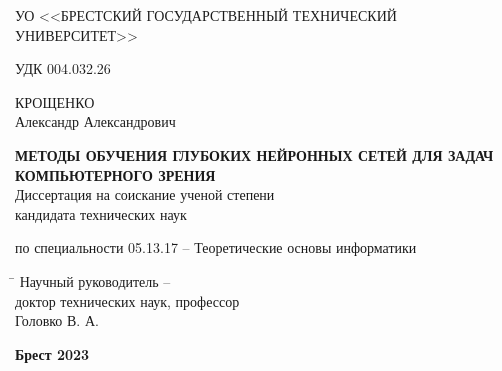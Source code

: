 \begin{titlepage}

\begin{center} \bfseries
\bigskip
\medskip

{УО <<БРЕСТСКИЙ ГОСУДАРСТВЕННЫЙ ТЕХНИЧЕСКИЙ УНИВЕРСИТЕТ>>}
\end{center}
\vspace{1cm}

\noindent УДК 004.032.26 \\
\vspace{1cm}

\begin{center}
{КРОЩЕНКО \\ Александр Александрович}\\ \vspace{1cm}

{\bfseries МЕТОДЫ ОБУЧЕНИЯ ГЛУБОКИХ НЕЙРОННЫХ СЕТЕЙ 
ДЛЯ ЗАДАЧ КОМПЬЮТЕРНОГО ЗРЕНИЯ}\\
\vspace{2cm}
Диссертация на соискание ученой степени\\
кандидата технических наук\\
\bigskip

по специальности 05.13.17 -- Теоретические основы информатики
\end{center}
\vspace{3cm}

\begin{tabbing}
\hspace{8cm} \= \kill \>
Научный руководитель --\+ \\
доктор технических наук, профессор\\
Головко В. А.
\end{tabbing}
\vspace{7cm}

\begin{center}
 \bfseries Брест 2023
\end{center}

\end{titlepage}